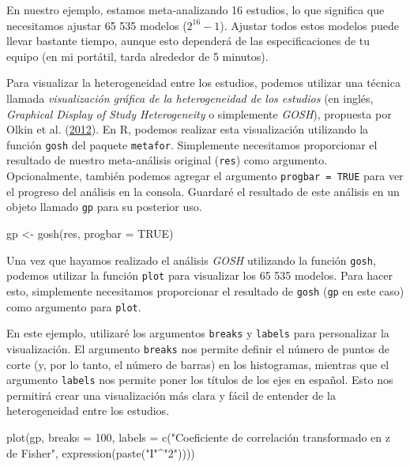 \documentclass[
  bookmarksnumbered]{article}
\newenvironment{Shaded}{\begin{snugshade}}{\end{snugshade}}
\newcommand{\AttributeTok}[1]{\textcolor[rgb]{0.00,0.34,0.68}{#1}}
\newcommand{\ConstantTok}[1]{\textcolor[rgb]{0.67,0.33,0.00}{#1}}
\newcommand{\DecValTok}[1]{\textcolor[rgb]{0.69,0.50,0.00}{#1}}
\newcommand{\FunctionTok}[1]{\textcolor[rgb]{0.39,0.29,0.61}{#1}}
\newcommand{\NormalTok}[1]{\textcolor[rgb]{0.12,0.11,0.11}{#1}}
\newcommand{\OtherTok}[1]{\textcolor[rgb]{0.00,0.43,0.16}{#1}}
\newcommand{\SpecialCharTok}[1]{\textcolor[rgb]{0.24,0.68,0.91}{#1}}
\newcommand{\StringTok}[1]{\textcolor[rgb]{0.75,0.01,0.01}{#1}}
\begin{document}
En nuestro ejemplo, estamos meta-analizando 16 estudios, lo que significa que necesitamos ajustar 65 535 modelos (\(2^{16} - 1\)). Ajustar todos estos modelos puede llevar bastante tiempo, aunque esto dependerá de las especificaciones de tu equipo (en mi portátil, tarda alrededor de 5 minutos).

Para visualizar la heterogeneidad entre los estudios, podemos utilizar una técnica llamada \emph{visualización gráfica de la heterogeneidad de los estudios} (en inglés, \emph{Graphical Display of Study Heterogeneity} o simplemente \emph{GOSH}), propuesta por Olkin et al. (\protect\hyperlink{ref-olkinGOSHGraphicalDisplay2012}{2012}). En R, podemos realizar esta visualización utilizando la función \texttt{gosh} del paquete \texttt{metafor}. Simplemente necesitamos proporcionar el resultado de nuestro meta-análisis original (\texttt{res}) como argumento. Opcionalmente, también podemos agregar el argumento \texttt{progbar\ =\ TRUE} para ver el progreso del análisis en la consola. Guardaré el resultado de este análisis en un objeto llamado \texttt{gp} para su posterior uso.

\begin{Shaded}
\begin{Highlighting}[]
\NormalTok{gp }\OtherTok{\textless{}{-}} \FunctionTok{gosh}\NormalTok{(res, }\AttributeTok{progbar =} \ConstantTok{TRUE}\NormalTok{)}
\end{Highlighting}
\end{Shaded}

Una vez que hayamos realizado el análisis \emph{GOSH} utilizando la función \texttt{gosh}, podemos utilizar la función \texttt{plot} para visualizar los 65 535 modelos. Para hacer esto, simplemente necesitamos proporcionar el resultado de \texttt{gosh} (\texttt{gp} en este caso) como argumento para \texttt{plot}.

En este ejemplo, utilizaré los argumentos \texttt{breaks} y \texttt{labels} para personalizar la visualización. El argumento \texttt{breaks} nos permite definir el número de puntos de corte (y, por lo tanto, el número de barras) en los histogramas, mientras que el argumento \texttt{labels} nos permite poner los títulos de los ejes en español. Esto nos permitirá crear una visualización más clara y fácil de entender de la heterogeneidad entre los estudios.

\begin{Shaded}
\begin{Highlighting}[]
\FunctionTok{plot}\NormalTok{(gp, }
     \AttributeTok{breaks =} \DecValTok{100}\NormalTok{,}
     \AttributeTok{labels =} \FunctionTok{c}\NormalTok{(}\StringTok{"Coeficiente de correlación transformado en z de Fisher"}\NormalTok{, }
                \FunctionTok{expression}\NormalTok{(}\FunctionTok{paste}\NormalTok{(}\StringTok{"I"}\SpecialCharTok{\^{}}\StringTok{"2"}\NormalTok{))))}
\end{Highlighting}
\end{Shaded}
\end{document}
